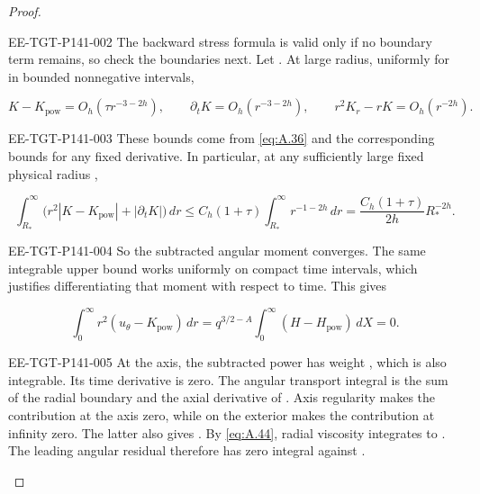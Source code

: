 \begin{proof}
\begin{EESegment}{EE-TGT-P141-002}
The backward stress formula is valid only if no boundary term remains, so check the boundaries next. Let
. At large radius, uniformly for
 in bounded nonnegative intervals,
\end{EESegment}
\begin{equation}
  K-K_{\mathrm{pow}}=O_h(\tau r^{-3-2h}),\qquad
  \partial_tK=O_h(r^{-3-2h}),\qquad
  r^2K_r-rK=O_h(r^{-2h}).
  \tag{A.44}\label{eq:A.44}
\end{equation}
\begin{EESegment}{EE-TGT-P141-003}
These bounds come from \eqref{eq:A.36} and the corresponding bounds for any fixed derivative. In particular, at any
sufficiently large fixed physical radius ,
\end{EESegment}
\[
  \int_{R_*}^\infty\bigl(r^2|K-K_{\mathrm{pow}}|+|\partial_tK|\bigr)\,dr
  \leq C_h(1+\tau)\int_{R_*}^\infty r^{-1-2h}\,dr
  =\frac{C_h(1+\tau)}{2h}R_*^{-2h}.
\]
\begin{EESegment}{EE-TGT-P141-004}
So the subtracted angular moment converges. The same integrable upper bound works uniformly on compact time intervals,
which justifies differentiating that moment with respect to time. This gives
\end{EESegment}
\begin{equation}
  \int_0^\infty r^2(u_\theta-K_{\mathrm{pow}})\,dr
  =q^{3/2-A}\int_0^\infty(H-H_{\mathrm{pow}})\,dX=0.
  \tag{A.45}\label{eq:A.45}
\end{equation}
\begin{EESegment}{EE-TGT-P141-005}
At the axis, the subtracted power has weight , which is also integrable. Its time
derivative is zero. The angular transport integral is the sum of the radial boundary
 and the axial derivative of
. Axis regularity makes the contribution at the axis
zero, while  on the exterior makes the contribution at infinity zero. The latter also gives
. By \eqref{eq:A.44}, radial viscosity integrates to
. The leading angular residual
 therefore has zero integral against
.
\end{EESegment}


\end{proof}
